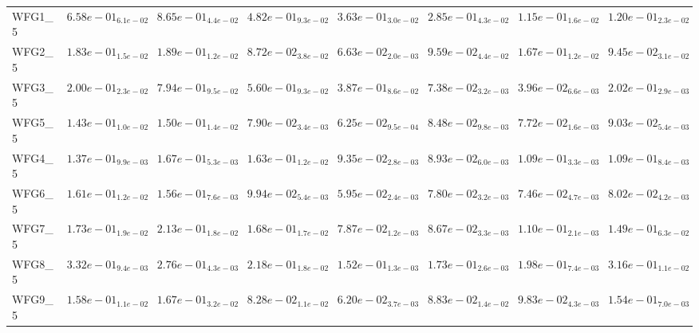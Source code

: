 \documentclass{article}
\begin{document}
\begin{landscape}
\begin{table}
\begin{scriptsize}
\begin{tabular}{llllllll}
WFG1\_5 & $  6.58e-01_{ 6.1e-02}$ & $  8.65e-01_{ 4.4e-02}$ & $  4.82e-01_{ 9.3e-02}$ & $  3.63e-01_{ 3.0e-02}$ & $  2.85e-01_{ 4.3e-02}$ & \cellcolor{gray95}$  1.15e-01_{ 1.6e-02}$ & \cellcolor{gray25}$  1.20e-01_{ 2.3e-02}$ \\
WFG2\_5 & $  1.83e-01_{ 1.5e-02}$ & $  1.89e-01_{ 1.2e-02}$ & \cellcolor{gray25}$  8.72e-02_{ 3.8e-02}$ & \cellcolor{gray95}$  6.63e-02_{ 2.0e-03}$ & $  9.59e-02_{ 4.4e-02}$ & $  1.67e-01_{ 1.2e-02}$ & $  9.45e-02_{ 3.1e-02}$ \\
WFG3\_5 & $  2.00e-01_{ 2.3e-02}$ & $  7.94e-01_{ 9.5e-02}$ & $  5.60e-01_{ 9.3e-02}$ & $  3.87e-01_{ 8.6e-02}$ & \cellcolor{gray25}$  7.38e-02_{ 3.2e-03}$ & \cellcolor{gray95}$  3.96e-02_{ 6.6e-03}$ & $  2.02e-01_{ 2.9e-03}$ \\
WFG5\_5 & $  1.43e-01_{ 1.0e-02}$ & $  1.50e-01_{ 1.4e-02}$ & $  7.90e-02_{ 3.4e-03}$ & \cellcolor{gray95}$  6.25e-02_{ 9.5e-04}$ & $  8.48e-02_{ 9.8e-03}$ & \cellcolor{gray25}$  7.72e-02_{ 1.6e-03}$ & $  9.03e-02_{ 5.4e-03}$ \\
WFG4\_5 & $  1.37e-01_{ 9.9e-03}$ & $  1.67e-01_{ 5.3e-03}$ & $  1.63e-01_{ 1.2e-02}$ & \cellcolor{gray25}$  9.35e-02_{ 2.8e-03}$ & \cellcolor{gray95}$  8.93e-02_{ 6.0e-03}$ & $  1.09e-01_{ 3.3e-03}$ & $  1.09e-01_{ 8.4e-03}$ \\
WFG6\_5 & $  1.61e-01_{ 1.2e-02}$ & $  1.56e-01_{ 7.6e-03}$ & $  9.94e-02_{ 5.4e-03}$ & \cellcolor{gray95}$  5.95e-02_{ 2.4e-03}$ & $  7.80e-02_{ 3.2e-03}$ & \cellcolor{gray25}$  7.46e-02_{ 4.7e-03}$ & $  8.02e-02_{ 4.2e-03}$ \\
WFG7\_5 & $  1.73e-01_{ 1.9e-02}$ & $  2.13e-01_{ 1.8e-02}$ & $  1.68e-01_{ 1.7e-02}$ & \cellcolor{gray95}$  7.87e-02_{ 1.2e-03}$ & \cellcolor{gray25}$  8.67e-02_{ 3.3e-03}$ & $  1.10e-01_{ 2.1e-03}$ & $  1.49e-01_{ 6.3e-02}$ \\
WFG8\_5 & $  3.32e-01_{ 9.4e-03}$ & $  2.76e-01_{ 4.3e-03}$ & $  2.18e-01_{ 1.8e-02}$ & \cellcolor{gray95}$  1.52e-01_{ 1.3e-03}$ & \cellcolor{gray25}$  1.73e-01_{ 2.6e-03}$ & $  1.98e-01_{ 7.4e-03}$ & $  3.16e-01_{ 1.1e-02}$ \\
WFG9\_5 & $  1.58e-01_{ 1.1e-02}$ & $  1.67e-01_{ 3.2e-02}$ & \cellcolor{gray25}$  8.28e-02_{ 1.1e-02}$ & \cellcolor{gray95}$  6.20e-02_{ 3.7e-03}$ & $  8.83e-02_{ 1.4e-02}$ & $  9.83e-02_{ 4.3e-03}$ & $  1.54e-01_{ 7.0e-03}$ \\
\hline
\end{tabular}
\end{scriptsize}
\end{table}


\end{landscape}
\end{document}
